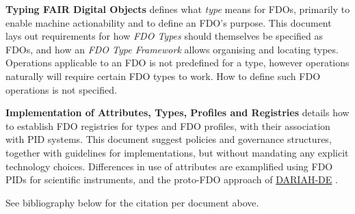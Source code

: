 \documentclass[fleqn,10pt,lineno]{wlpeerjlua}
\begin{document}
\textbf{Typing FAIR Digital Objects} \autocite{fdo-TypingFDOs} defines what \emph{type} means for FDOs, primarily to enable machine actionability and to define an FDO's purpose. This document lays out requirements for how \emph{FDO Types} should themselves be specified as FDOs, and how an \emph{FDO Type Framework} allows organising and locating types. Operations applicable to an FDO is not predefined for a type, however operations naturally will require certain FDO types to work. How to define such FDO operations is not specified.

\textbf{Implementation of Attributes, Types, Profiles and Registries} \autocite{fdo-ImplAttributesTypesProfiles} details how to establish FDO registries for types and FDO profiles, with their association with PID systems. This document suggest policies and governance structures, together with guidelines for implementations, but without mandating any explicit technology choices. Differences in use of attributes are examplified using FDO PIDs for scientific instruments, and the proto-FDO approach of \href{https://de.dariah.eu/}{DARIAH-DE} \autocite{schwardmannTwoExamplesHow2022}. 

See bibliography below for the citation per document above. 

{}
\printshorthands[heading=fdobibliography]


\end{document}
